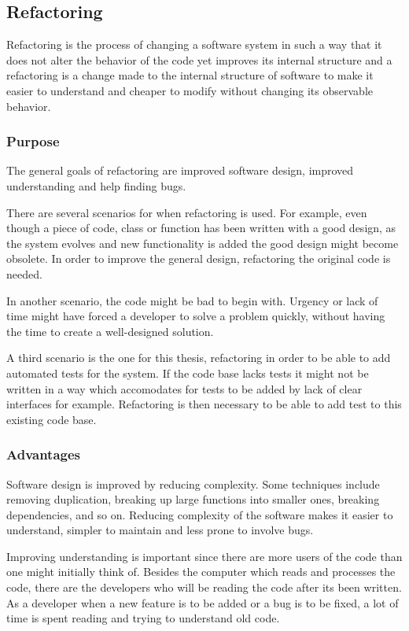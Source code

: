 \documentclass{article}
\begin{document}
		\subsection{Refactoring}
		Refactoring is the process of changing a software system in such a way that it does not alter the behavior of the code yet improves its internal structure and a refactoring is a change made to the internal structure of software to make it easier to understand and cheaper to modify without changing its observable behavior. \cite{refactor}

			\subsubsection{Purpose}
			The general goals of refactoring are improved software design, improved understanding and help finding bugs.

			There are several scenarios for when refactoring is used. For example, even though a piece of code, class or function has been written with a good design, as the system evolves and new functionality is added the good design might become obsolete. In order to improve the general design, refactoring the original code is needed.

			In another scenario, the code might be bad to begin with. Urgency or lack of time might have forced a developer to solve a problem quickly, without having the time to create a well-designed solution.

			A third scenario is the one for this thesis, refactoring in order to be able to add automated tests for the system. If the code base lacks tests it might not be written in a way which accomodates for tests to be added by lack of clear interfaces for example. Refactoring is then necessary to be able to add test to this existing code base.

			\subsubsection{Advantages}
			Software design is improved by reducing complexity. Some techniques include removing duplication, breaking up large functions into smaller ones, breaking dependencies, and so on.
			Reducing complexity of the software makes it easier to understand, simpler to maintain and less prone to involve bugs.

			Improving understanding is important since there are more users of the code than one might initially think of. Besides the computer which reads and processes the code, there are the developers who will be reading the code after its been written. As a developer when a new feature is to be added or a bug is to be fixed, a lot of time is spent reading and trying to understand old code.
\end{document}

